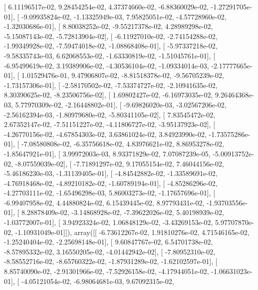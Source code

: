 \documentclass{article}
\begin{document}
       [  6.11196517e-02,   9.28454254e-02,   4.37374660e-02,
         -6.88360029e-02,  -1.27291705e-01],
       [ -9.09935824e-02,  -1.13325949e-03,   7.95825051e-02,
         -4.57728960e-02,  -1.32030686e-01],
       [  8.80038252e-02,  -9.55217378e-02,   4.28989298e-02,
         -5.15087143e-02,  -5.72813904e-02],
       [ -6.11927010e-02,  -2.74154288e-02,  -1.99349928e-02,
         -7.59474018e-02,  -1.08868408e-01],
       [ -5.97337218e-02,  -9.58335743e-03,   6.62068553e-02,
         -1.63330819e-02,  -1.51045761e-01],
       [ -6.95499619e-02,   3.19389906e-02,  -4.30536104e-02,
         -1.09334014e-03,  -2.17777665e-01],
       [  1.01529476e-01,   9.47906807e-02,  -8.81518378e-02,
         -9.56705239e-02,  -1.73157306e-01],
       [ -2.58170502e-02,  -7.53374727e-02,  -2.10941635e-02,
          8.30390625e-02,  -8.23506756e-02],
       [  1.69802427e-02,  -6.16973035e-02,   9.26464368e-03,
          5.77970309e-02,  -2.16448802e-01],
       [ -9.69826020e-03,  -3.02567206e-02,  -2.56162394e-03,
         -1.80979680e-02,  -5.80341105e-02],
       [  7.83545472e-02,   2.67352147e-02,  -7.51151227e-02,
         -4.11806727e-02,  -3.95137923e-02],
       [ -4.26770156e-02,  -4.67854303e-02,   3.63861024e-02,
          3.84923990e-02,  -1.73575286e-01],
       [ -7.08580808e-02,  -6.35756618e-02,   4.83976621e-02,
          8.86953278e-02,  -1.85647921e-01],
       [  3.99972003e-03,   8.93371829e-02,   7.07087239e-05,
         -5.00913752e-02,  -8.07559039e-02],
       [ -7.71891297e-02,   9.17055154e-02,   7.46044156e-02,
         -5.46186230e-03,  -1.31139405e-01],
       [ -4.84542882e-02,  -1.33589691e-02,  -4.76918468e-02,
         -4.89210182e-02,  -1.60789194e-01],
       [ -4.85286296e-02,  -4.27703111e-02,  -1.65496298e-03,
          5.86003273e-02,  -1.17657696e-01],
       [ -6.99407958e-02,   4.44880824e-02,   6.15439445e-02,
          8.97793431e-02,  -1.93703556e-01],
       [  8.28878409e-02,  -3.14868928e-02,  -7.39622026e-02,
          5.40198939e-02,  -1.03772007e-01],
       [  3.94923324e-02,   1.06848129e-02,  -3.43269153e-02,
          5.97707870e-02,  -1.10931049e-01]]), array([[ -6.73612267e-02,   1.91810276e-02,   4.71546165e-02,
         -1.25240404e-02,  -2.25698148e-01],
       [  9.60847767e-02,   6.54701738e-02,  -8.57895332e-02,
          3.16550205e-02,  -4.01442942e-02],
       [ -7.80952310e-02,  -8.58552716e-02,  -8.65760322e-02,
         -1.87931289e-02,  -1.62102597e-01],
       [  8.85740090e-02,  -2.91301966e-02,  -7.52926158e-02,
         -4.17944051e-02,  -1.06631023e-01],
       [ -4.05121054e-02,  -6.98064681e-03,   9.67092315e-02,
\end{document}
